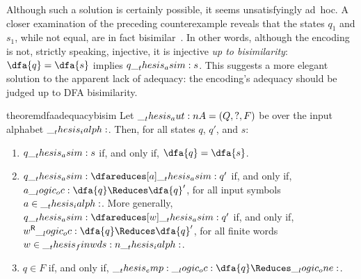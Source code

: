 Although such a solution is certainly possible, it seems unsatisfyingly ad~hoc.
A closer examination of the preceding counterexample reveals that the states $q_1$ and $s_1$, while not equal, are in fact bisimilar~.
In other words, although the encoding is not, strictly speaking, injective, it is injective \emph{up to bisimilarity}: $\dfa{q} = \dfa{s}$ implies $q \__thesis_asim: s$.
This suggests a more elegant solution to the apparent lack of adequacy: the encoding's adequacy should be judged up to \ac{DFA} bisimilarity.
%
\newcommand{\dfaadequacybisimbody}{%
  Let $\aut{A} = (Q, ?, F)$ be \iac{DFA} over the input alphabet $\ialph$.
  Then, for all states $q$, $q'$, and $s$:
  \begin{enumerate}
  \item\label{enum:ordered-rewriting:dfa-adequacy:1}
    $q \asim s$ if, and only if, $\dfa{q} = \dfa{s}$.
  \item\label{enum:ordered-rewriting:dfa-adequacy:2}
    $q \asim\dfareduces[a]\asim q'$ if, and only if, $a \oc \dfa{q} \Reduces \dfa{q}'$, for all input symbols $a \in \ialph$.    
    More generally, $q \asim\dfareduces[w]\asim q'$ if, and only if, $\rev{w} \oc \dfa{q} \Reduces \dfa{q}'$, for all finite words $w \in \finwds{\ialph}$.
  \item\label{enum:ordered-rewriting:dfa-adequacy:3}
    $q \in F$ if, and only if, $\emp \oc \dfa{q} \Reduces \one$.
  \end{enumerate}%
}%
%  
\begin{restatable*}[
  name=\ac*{DFA} adequacy up to bisimilarity,
  label=thm:ordered-rewriting:dfa-adequacy-bisim
]{theorem}{dfaadequacybisim}
  \dfaadequacybisimbody
\end{restatable*}

